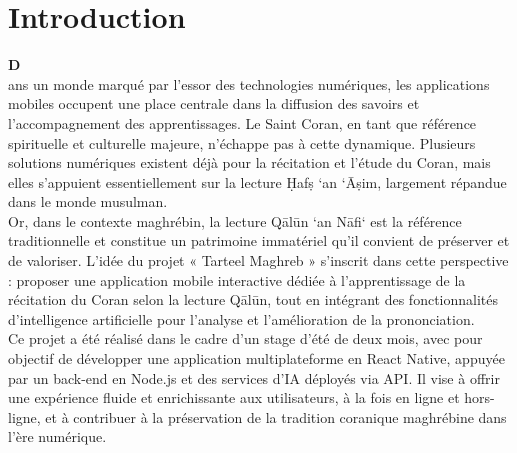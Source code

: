 \chapter*{Introduction}
\label{chap:introduction}


 	\noindent\lettrine[lines=2]{\textbf{D}}\\ ans un monde marqué par l’essor des technologies numériques, les applications mobiles occupent une place centrale dans la diffusion des savoirs et l’accompagnement des apprentissages. Le Saint Coran, en tant que référence spirituelle et culturelle majeure, n’échappe pas à cette dynamique. Plusieurs solutions numériques existent déjà pour la récitation et l’étude du Coran, mais elles s’appuient essentiellement sur la lecture Ḥafṣ ‘an ‘Āṣim, largement répandue dans le monde musulman.\\

Or, dans le contexte maghrébin, la lecture Qālūn ‘an Nāfi‘ est la référence traditionnelle et constitue un patrimoine immatériel qu’il convient de préserver et de valoriser. L’idée du projet « Tarteel Maghreb » s’inscrit dans cette perspective : proposer une application mobile interactive dédiée à l’apprentissage de la récitation du Coran selon la lecture Qālūn, tout en intégrant des fonctionnalités d’intelligence artificielle pour l’analyse et l’amélioration de la prononciation.\\

Ce projet a été réalisé dans le cadre d’un stage d’été de deux mois, avec pour objectif de développer une application multiplateforme en React Native, appuyée par un back-end en Node.js et des services d’IA déployés via API. Il vise à offrir une expérience fluide et enrichissante aux utilisateurs, à la fois en ligne et hors-ligne, et à contribuer à la préservation de la tradition coranique maghrébine dans l’ère numérique.

    \vspace{0.5cm} %

    
	 
   \noindent 

